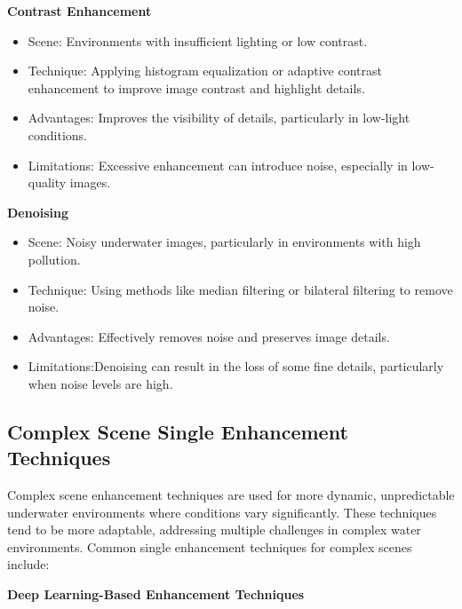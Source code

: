 \documentclass[withoutpreface,bwprint]{cumcmthesis}
\begin{document}
\textbf{Contrast Enhancement}

\begin{itemize}[itemindent=2em]
    \item Scene: Environments with insufficient lighting or low contrast.

    \item Technique: Applying histogram equalization or adaptive contrast enhancement to improve image contrast and highlight details.

    \item  Advantages: Improves the visibility of details, particularly in low-light conditions.

    \item  Limitations: Excessive enhancement can introduce noise, especially in low-quality images.
\end{itemize}

\textbf{Denoising}

\begin{itemize}[itemindent=2em]
    \item Scene: Noisy underwater images, particularly in environments with high pollution.

    \item Technique: Using methods like median filtering or bilateral filtering to remove noise.

    \item  Advantages: Effectively removes noise and preserves image details.

    \item  Limitations:Denoising can result in the loss of some fine details, particularly when noise levels are high.
\end{itemize}

\subsection{Complex Scene Single Enhancement Techniques}

Complex scene enhancement techniques are used for more dynamic, unpredictable underwater environments where conditions vary significantly. These techniques tend to be more adaptable, addressing multiple challenges in complex water environments. Common single enhancement techniques for complex scenes include:

\textbf{Deep Learning-Based Enhancement Techniques}
\end{document}
